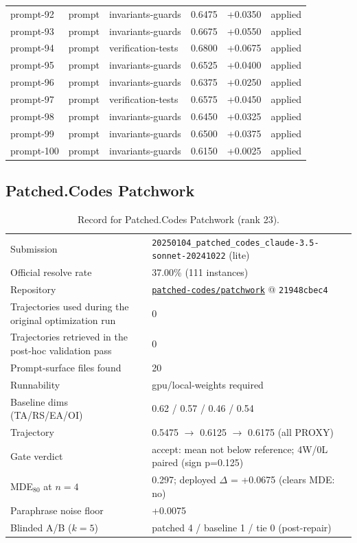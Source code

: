 \begin{center}
\begin{longtable}{llp{5.2cm}rrl}
prompt-92 & prompt & invariants-guards & 0.6475 & +0.0350 & applied \\
prompt-93 & prompt & invariants-guards & 0.6675 & +0.0550 & applied \\
prompt-94 & prompt & verification-tests & 0.6800 & +0.0675 & applied \\
prompt-95 & prompt & invariants-guards & 0.6525 & +0.0400 & applied \\
prompt-96 & prompt & invariants-guards & 0.6375 & +0.0250 & applied \\
prompt-97 & prompt & verification-tests & 0.6575 & +0.0450 & applied \\
prompt-98 & prompt & invariants-guards & 0.6450 & +0.0325 & applied \\
prompt-99 & prompt & invariants-guards & 0.6500 & +0.0375 & applied \\
prompt-100 & prompt & invariants-guards & 0.6150 & +0.0025 & applied \\
\bottomrule\end{longtable}\end{center}
\clearpage
\subsection{Patched.Codes Patchwork}
\label{app:agent23}
\begin{table}[h]\centering\scriptsize
\caption{Record for Patched.Codes Patchwork (rank 23).}
\begin{tabular}{lp{8.2cm}}\toprule
Submission & \texttt{20250104\_\allowbreak{}patched\_\allowbreak{}codes\_\allowbreak{}claude-3.5-sonnet-20241022} (lite) \\
Official resolve rate & 37.00\% (111 instances) \\
Repository & \href{https://github.com/patched-codes/patchwork}{\texttt{patched-codes/patchwork}} @ \texttt{21948cbec4} \\
Trajectories used during the original optimization run & 0 \\
Trajectories retrieved in the post-hoc validation pass & 0 \\
Prompt-surface files found & 20 \\
Runnability & gpu/local-weights required \\
Baseline dims (TA/RS/EA/OI) & 0.62 / 0.57 / 0.46 / 0.54 \\
Trajectory & 0.5475 $\to$ 0.6125 $\to$ 0.6175 (all PROXY) \\
Gate verdict & accept: mean not below reference; 4W/0L paired (sign p=0.125) \\
MDE$_{80}$ at $n{=}4$ & 0.297; deployed $\Delta$ = +0.0675 (clears MDE: no) \\
Paraphrase noise floor & +0.0075 \\
Blinded A/B ($k{=}5$) & patched 4 / baseline 1 / tie 0 (post-repair) \\
\bottomrule\end{tabular}\end{table}
